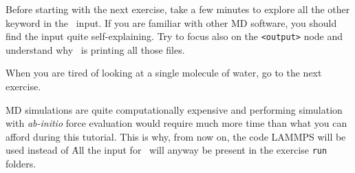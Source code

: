 \documentclass{article}
\begin{document}
Before starting with the next exercise, take a few minutes to explore
all the other keyword in the \ipi\ input. If you are familiar with
other MD software, you should find the input quite self-explaining.
Try to focus also on the \texttt{<output>} node and understand why
\ipi\ is printing all those files.


When you are tired of looking at a single molecule of water, go to the
next exercise. 

MD simulations are quite computationally expensive and performing
simulation with \emph{ab-initio} force evaluation would require much
more time than what you can afford during this tutorial. This is why,
from now on, the code LAMMPS will be used instead of \qe\. All the
input for \qe\ will anyway be present in the exercise \texttt{run} folders.

\vspace{2em}
\end{document}

